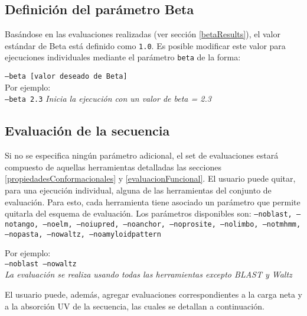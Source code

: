\subsection{Definición del parámetro Beta}

Basándose en las evaluaciones realizadas (ver sección \ref{betaResults}), el valor estándar de Beta está definido como \texttt{1.0}. 
Es posible modificar este valor para ejecuciones individuales mediante el parámetro \texttt{beta} de la forma:

\indent \texttt{--beta [valor deseado de Beta]} 
\\Por ejemplo: \\
\indent \texttt{--beta 2.3} \hspace{0.5cm} \textit{Inicia la ejecución con un valor de beta = 2.3}



\subsection{Evaluación de la secuencia}\label{evaluacion}

Si no se especifica ningún parámetro adicional, el set de evaluaciones estará compuesto de aquellas herramientas detalladas las secciones \ref{propiedadesConformacionales} y \ref{evaluacionFuncional}.
El usuario puede quitar, para una ejecución individual, alguna de las herramientas del conjunto de evaluación. Para esto, cada herramienta tiene asociado un parámetro que permite quitarla del esquema de evaluación.
Los parámetros disponibles son: 
\texttt{--noblast, --notango, --noelm, --noiupred, --noanchor, --noprosite, 
--nolimbo, 
--notmhmm, 
--nopasta, 
--nowaltz, 
--noamyloidpattern}

\noindent Por ejemplo: \\
\indent \texttt{--noblast --nowaltz} \\%
\indent \indent \textit{La evaluación se realiza usando todas las herramientas excepto BLAST y Waltz}




El usuario puede, además, agregar evaluaciones correspondientes a la carga neta y a la absorción UV de la secuencia, las cuales se detallan a continuación.

